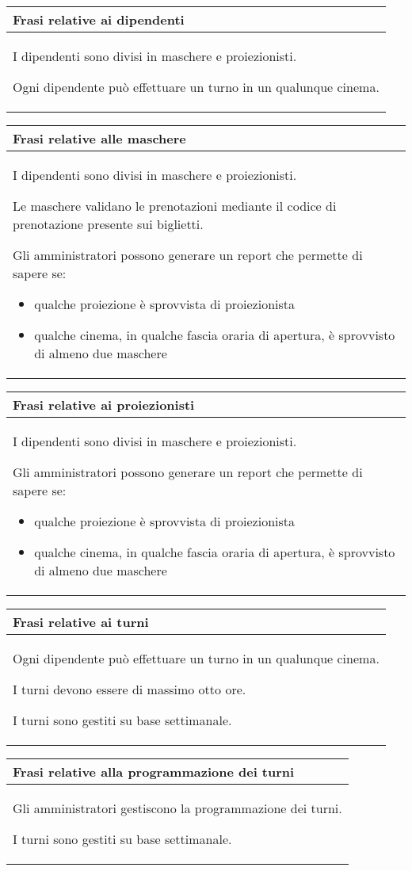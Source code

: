 \begin{tabularx}{\linewidth}{|X|}
    \hline
    \rowcolor{tblhdrcolor}
    \textbf{Frasi relative ai dipendenti} \\\hline
    I dipendenti sono divisi in maschere e proiezionisti.
    
    Ogni dipendente può effettuare un turno in un qualunque cinema.
    \\ \hline
\end{tabularx}

\begin{tabularx}{\linewidth}{|X|}
    \hline
    \rowcolor{tblhdrcolor}
    \textbf{Frasi relative alle maschere} \\\hline
    I dipendenti sono divisi in maschere e proiezionisti.
    
    Le maschere validano le prenotazioni mediante il codice
    di prenotazione presente sui biglietti.

    Gli amministratori possono generare un report che permette di
    sapere se:
    \begin{itemize}
        \item qualche proiezione è sprovvista di proiezionista
        \item qualche cinema, in qualche fascia oraria di apertura,
              è sprovvisto di almeno due maschere
    \end{itemize}
    \\ \hline
\end{tabularx}

\begin{tabularx}{\linewidth}{|X|}
    \hline
    \rowcolor{tblhdrcolor}
    \textbf{Frasi relative ai proiezionisti} \\\hline
    I dipendenti sono divisi in maschere e proiezionisti.
    
    Gli amministratori possono generare un report che permette di
    sapere se:
    \begin{itemize}
        \item qualche proiezione è sprovvista di proiezionista
        \item qualche cinema, in qualche fascia oraria di apertura,
              è sprovvisto di almeno due maschere
    \end{itemize}
    \\ \hline
\end{tabularx}

\begin{tabularx}{\linewidth}{|X|}
    \hline
    \rowcolor{tblhdrcolor}
    \textbf{Frasi relative ai turni} \\\hline
    Ogni dipendente può effettuare un turno in un qualunque cinema.
    
    I turni devono essere di massimo otto ore.
    
    I turni sono gestiti su base settimanale.
    \\ \hline
\end{tabularx}

\begin{tabularx}{\linewidth}{|X|}
    \hline
    \rowcolor{tblhdrcolor}
    \textbf{Frasi relative alla programmazione dei turni} \\\hline
    Gli amministratori gestiscono la programmazione dei turni.
    
    I turni sono gestiti su base settimanale.
    \\ \hline
\end{tabularx}
